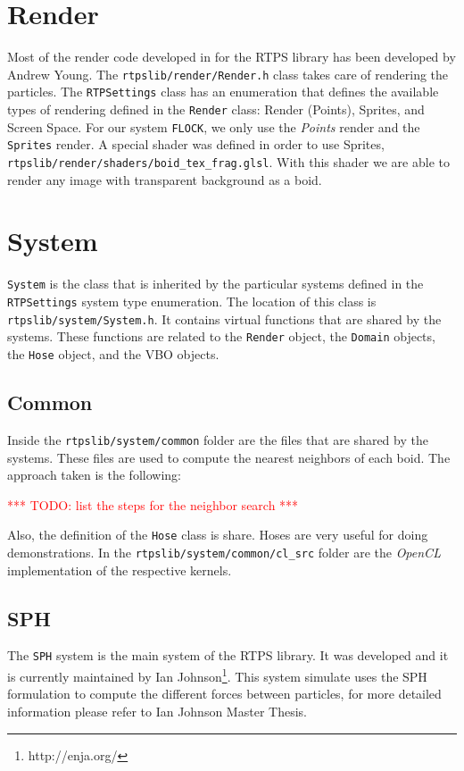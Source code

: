 \section{Render}
Most of the render code developed in for the RTPS library has been developed by Andrew Young. The \texttt{rtpslib/render/Render.h} class takes care of rendering the particles. The \texttt{RTPSettings} class has an enumeration that defines the available types of rendering defined in the \texttt{Render} class: Render (Points), Sprites, and Screen Space. For our system \texttt{FLOCK}, we only use the \textit{Points} render and the \texttt{Sprites} render. A special shader was defined in order to use Sprites, \texttt{rtpslib/render/shaders/boid\_tex\_frag.glsl}. With this shader we are able to render any image with transparent background as a boid.

\section{System}
\texttt{System} is the class that is inherited by the particular systems defined in the \texttt{RTPSettings} system type enumeration. The location of this class is \texttt{rtpslib/system/System.h}. It contains virtual functions that are shared by the systems. These functions are related to the \texttt{Render} object,  the \texttt{Domain} objects, the \texttt{Hose} object, and the VBO objects.

\subsection{Common}
Inside the \texttt{rtpslib/system/common} folder are the files that are shared by the systems. These files are used to compute the nearest neighbors of each boid. The approach taken is the following:

\textcolor{red}{*** TODO:  list the steps for the neighbor search ***}

Also, the definition of the \texttt{Hose} class is share. Hoses are very useful for doing demonstrations. In the \texttt{rtpslib/system/common/cl\_src} folder are the \textit{OpenCL} implementation of the respective kernels.

\subsection{SPH}
The \texttt{SPH} system is the main system of the RTPS library. It was developed and it is currently maintained by Ian Johnson\footnote{http://enja.org/}\cite{ianPaper}. This system simulate uses the SPH formulation to compute the different forces between particles, for more detailed information please refer to Ian Johnson Master Thesis\cite{ianThesis}.

